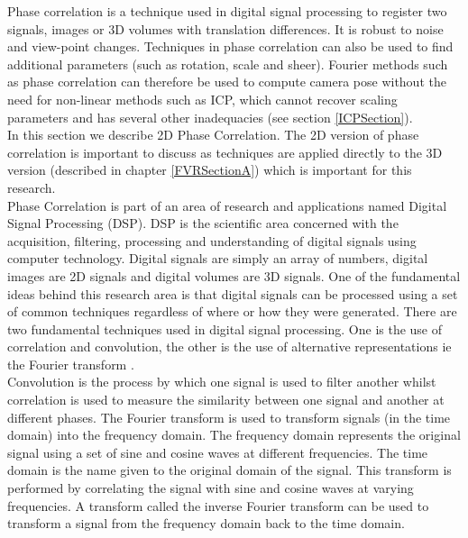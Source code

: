 Phase correlation is a technique used in digital signal processing to register two signals, images or 3D volumes with translation differences. It is robust to noise and view-point changes. Techniques in phase correlation can also be used to find additional parameters (such as rotation, scale and sheer). Fourier methods such as phase correlation can therefore be used to compute camera pose without the need for non-linear methods such as ICP, which cannot recover scaling parameters and has several other inadequacies (see section \ref{ICPSection}). \\ 

In this section we describe 2D Phase Correlation. The 2D version of phase correlation is important to discuss as techniques are applied directly to the 3D version (described in chapter \ref{FVRSectionA}) which is important for this research. \\

Phase Correlation is part of an area of research and applications named Digital Signal Processing (DSP). DSP is the scientific area concerned with the acquisition, filtering, processing and understanding of digital signals using computer technology. Digital signals are simply an array of numbers, digital images are 2D signals and digital volumes are 3D signals. One of the fundamental ideas behind this research area is that digital signals can be processed using a set of common techniques regardless of where or how they were generated. There are two fundamental techniques used in digital signal processing. One is the use of correlation and convolution, the other is the use of alternative representations ie the Fourier transform \cite{Smith97Scientist}. \\

Convolution is the process by which one signal is used to filter another whilst correlation is used to measure the similarity between one signal and another at different phases. The Fourier transform is used to transform signals (in the time domain) into the frequency domain. The frequency domain represents the original signal using a set of sine and cosine waves at different frequencies. The time domain is the name given to the original domain of the signal. This transform is performed by correlating the signal with sine and cosine waves at varying frequencies. A transform called the inverse Fourier transform can be used to transform a signal from the frequency domain back to the time domain. \\

